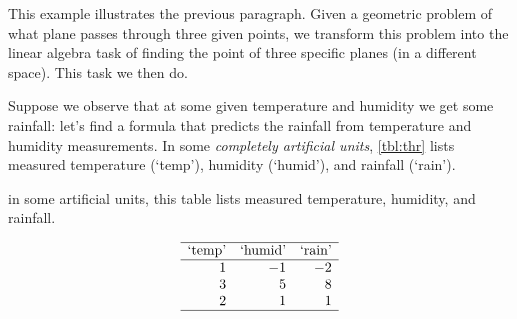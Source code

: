 \begin{example} \label{eg:inf3pts}
This example illustrates the previous paragraph.
Given a geometric problem of  what plane passes through three given points, we transform this problem into the linear algebra task of finding the  point of three specific planes (in a different space).
This task we then do.


Suppose we observe that at some given temperature and humidity we get some rainfall: let's find a formula that predicts the rainfall from temperature and humidity measurements.
In some \emph{completely artificial units}, \autoref{tbl:thr} lists measured temperature (`temp'), humidity (`humid'), and rainfall (`rain').
\begin{table}
\caption{in some artificial units, this table lists measured temperature, humidity, and rainfall.}
\label{tbl:thr}
\begin{equation*}
\begin{array}{rrr} \hline
\text{`temp'}&\text{`humid'}&\text{`rain'}\\\hline
1&-1&-2\\
3&5&8\\
2&1&1\\\hline
\end{array}
\end{equation*}
\end{table}


\end{example}
